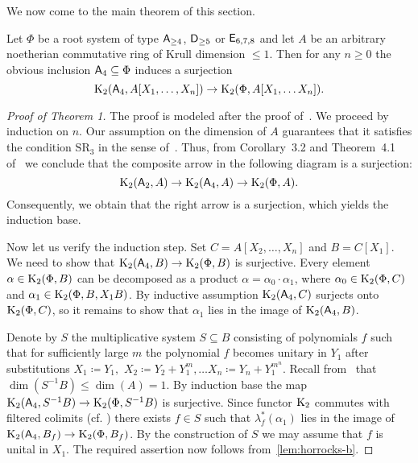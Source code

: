We now come to the main theorem of this section.
\begin{thm}\label{thm:early-stability}
Let $\Phi$ be a root system of type $\mathsf{A}_{\geq 4}$, $\mathsf{D}_{\geq 5}$ or $\mathsf{E}_{6,7,8}$ and let $A$ be an arbitrary noetherian commutative ring of Krull dimension $\leq 1$.
Then for any $n \geq 0$ the obvious inclusion $\mathsf{A}_4 \subseteq \Phi$ induces a surjection
\[\operatorname{K}_2(\mathsf{A}_4, A[X_1,\ldots, X_n]) \to \operatorname{K}_2(\Phi, A[X_1, \ldots X_n]).\]
\end{thm}
\begin{proof}[Proof of Theorem 1]
    The proof is modeled after the proof of~\cite[Theorem~5.3]{Tu83}.
    We proceed by induction on $n$.
    Our assumption on the dimension of $A$ guarantees that it satisfies the condition $\mathrm{SR}_3$ in the sense of~\cite{St78}.
    Thus, from Corollary~3.2 and Theorem~4.1 of~\cite{St78} we conclude that the composite arrow in the following diagram is a surjection:
    \[\operatorname{K}_2(\mathsf{A}_2, A) \to \operatorname{K}_2(\mathsf{A}_4, A) \to \operatorname{K}_2(\Phi, A).\]
    Consequently, we obtain that the right arrow is a surjection, which yields the induction base.

    Now let us verify the induction step.
    Set $C = A[X_2, \ldots , X_n]$ and $B = C[X_1]$.
    We need to show that $\operatorname{K}_2(\mathsf{A}_4, B) \to \operatorname{K}_2(\Phi, B)$ is surjective.
    Every element $\alpha \in \operatorname{K}_2(\Phi, B)$ can be decomposed as a product $\alpha = \alpha_0 \cdot \alpha_1$,
      where $\alpha_0 \in \operatorname{K}_2(\Phi, C)$ and $\alpha_1 \in \operatorname{K}_2(\Phi, B, X_1 B)$.
    By inductive assumption $\operatorname{K}_2(\mathsf{A}_4, C)$ surjects onto $\operatorname{K}_2(\Phi, C)$, so it remains to show that $\alpha_1$ lies in the image of $\operatorname{K}_2(\mathsf{A}_4, B)$.

    Denote by $S$ the multiplicative system $S \subseteq B$ consisting of polynomials $f$ such that for sufficiently large $m$
    the polynomial $f$ becomes unitary in $Y_1$ after substitutions $X_1 \coloneqq Y_1,$ $X_2 \coloneqq Y_2 + Y_1^m, \ldots X_n \coloneqq Y_n + Y_1^{m^n}$.
    Recall from~\cite[\S~6]{Su77} that $\dim(S^{-1}B) \leq \dim(A) = 1$.
    By induction base the map $\operatorname{K}_2(\mathsf{A}_4, S^{-1}B) \to \operatorname{K}_2(\Phi, S^{-1}B)$ is surjective.
    Since functor $\operatorname{K}_2$ commutes with filtered colimits (cf. \cite[Lemma~3.3]{LSV2}) there exists $f \in S$ such that $\lambda^*_f(\alpha_1)$ lies in the image of $\operatorname{K}_2(\mathsf{A}_4, B_f) \to \operatorname{K}_2(\Phi, B_f)$.
    By the construction of $S$ we may assume that $f$ is unital in $X_1$.
    The required assertion now follows from~\cref{lem:horrocks-b}.
\end{proof}


